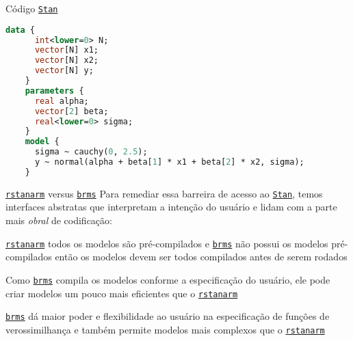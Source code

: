 \begin{frame}[fragile]{Código \href{https://mc-stan.org}{\texttt{Stan}}}
	\begin{lstlisting}[basicstyle=\small, language=Stan]
    data {
      int<lower=0> N;
      vector[N] x1;
      vector[N] x2;
      vector[N] y;
    }
    parameters {
      real alpha;
      vector[2] beta;
      real<lower=0> sigma;
    }
    model {
      sigma ~ cauchy(0, 2.5);
      y ~ normal(alpha + beta[1] * x1 + beta[2] * x2, sigma);
    }
    \end{lstlisting}
\end{frame}

\begin{frame}{\href{http://mc-stan.org/rstanarm/}{\texttt{rstanarm}} versus \href{https://paul-buerkner.github.io/brms/}{\texttt{brms}}}
	Para remediar essa barreira de acesso ao \href{https://mc-stan.org}{\texttt{Stan}},
	temos interfaces abstratas que interpretam a intenção do usuário e
	lidam com a parte mais \textit{obral} de codificação:
	\begin{vfilleditems}
		\small
		\item \href{http://mc-stan.org/rstanarm/}{\texttt{rstanarm}} todos os
		modelos são pré-compilados e
		\href{https://paul-buerkner.github.io/brms/}{\texttt{brms}} não possui os
		modelos pré-compilados então os modelos devem ser todos compilados antes de serem rodados
		\item Como \href{https://paul-buerkner.github.io/brms/}{\texttt{brms}}
		compila os modelos conforme a especificação do usuário, ele pode criar
		modelos um pouco mais eficientes que o \href{http://mc-stan.org/rstanarm/}{\texttt{rstanarm}}
		\item \href{https://paul-buerkner.github.io/brms/}{\texttt{brms}} dá maior poder e flexibilidade
		ao usuário na especificação de funções de verossimilhança e também permite modelos mais complexos
		que o \href{http://mc-stan.org/rstanarm/}{\texttt{rstanarm}}
	\end{vfilleditems}
\end{frame}

